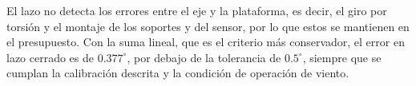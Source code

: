 \documentclass[../../General.tex]{subfiles}
\begin{document}
El lazo no detecta los errores entre el eje y la plataforma, es decir, el giro por torsión y el montaje de los soportes y del sensor, por lo que estos se mantienen en el presupuesto.
Con la suma lineal, que es el criterio más conservador, el error en lazo cerrado es de $0.377^\circ$, por debajo de la tolerancia de $0.5^\circ$, siempre que se cumplan la calibración descrita y la condición de operación de viento.
\end{document}

